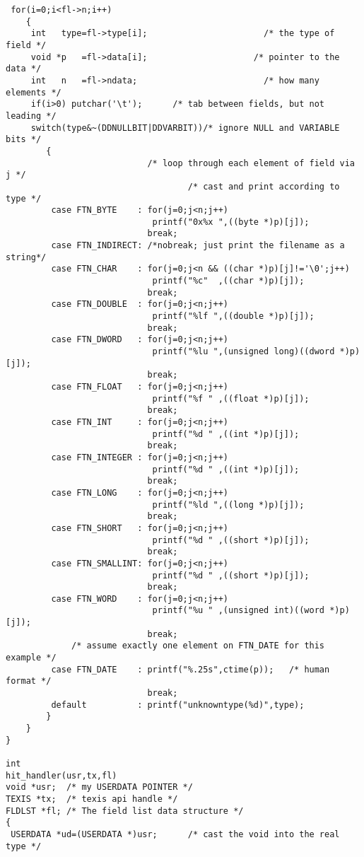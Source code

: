 \begin{verbatim}
 for(i=0;i<fl->n;i++)
    {
     int   type=fl->type[i];                       /* the type of field */
     void *p   =fl->data[i];                     /* pointer to the data */
     int   n   =fl->ndata;                         /* how many elements */
     if(i>0) putchar('\t');      /* tab between fields, but not leading */
     switch(type&~(DDNULLBIT|DDVARBIT))/* ignore NULL and VARIABLE bits */
        {
                            /* loop through each element of field via j */
                                    /* cast and print according to type */
         case FTN_BYTE    : for(j=0;j<n;j++)
                             printf("0x%x ",((byte *)p)[j]);
                            break;
         case FTN_INDIRECT: /*nobreak; just print the filename as a string*/
         case FTN_CHAR    : for(j=0;j<n && ((char *)p)[j]!='\0';j++)
                             printf("%c"  ,((char *)p)[j]);
                            break;
         case FTN_DOUBLE  : for(j=0;j<n;j++)
                             printf("%lf ",((double *)p)[j]);
                            break;
         case FTN_DWORD   : for(j=0;j<n;j++)
                             printf("%lu ",(unsigned long)((dword *)p)[j]);
                            break;
         case FTN_FLOAT   : for(j=0;j<n;j++)
                             printf("%f " ,((float *)p)[j]);
                            break;
         case FTN_INT     : for(j=0;j<n;j++)
                             printf("%d " ,((int *)p)[j]);
                            break;
         case FTN_INTEGER : for(j=0;j<n;j++)
                             printf("%d " ,((int *)p)[j]);
                            break;
         case FTN_LONG    : for(j=0;j<n;j++)
                             printf("%ld ",((long *)p)[j]);
                            break;
         case FTN_SHORT   : for(j=0;j<n;j++)
                             printf("%d " ,((short *)p)[j]);
                            break;
         case FTN_SMALLINT: for(j=0;j<n;j++)
                             printf("%d " ,((short *)p)[j]);
                            break;
         case FTN_WORD    : for(j=0;j<n;j++)
                             printf("%u " ,(unsigned int)((word *)p)[j]);
                            break;
             /* assume exactly one element on FTN_DATE for this example */
         case FTN_DATE    : printf("%.25s",ctime(p));   /* human format */
                            break;
         default          : printf("unknowntype(%d)",type);
        }
    }
}

int
hit_handler(usr,tx,fl)
void *usr;  /* my USERDATA POINTER */
TEXIS *tx;  /* texis api handle */
FLDLST *fl; /* The field list data structure */
{
 USERDATA *ud=(USERDATA *)usr;      /* cast the void into the real type */


\end{verbatim}
